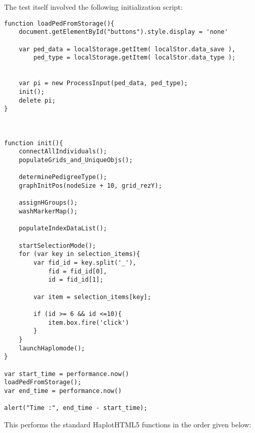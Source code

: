 The test itself involved the following initialization script:

\begingroup
\begin{spacing}{1}
\begin{lstlisting}[label=code:inithaplo]
function loadPedFromStorage(){
	document.getElementById("buttons").style.display = 'none'

	var ped_data = localStorage.getItem( localStor.data_save ),
		ped_type = localStorage.getItem( localStor.data_type );


	var pi = new ProcessInput(ped_data, ped_type);
	init();
	delete pi;
}



function init(){
	connectAllIndividuals();
	populateGrids_and_UniqueObjs();

	determinePedigreeType();
	graphInitPos(nodeSize + 10, grid_rezY);

	assignHGroups();
	washMarkerMap();

	populateIndexDataList();

	startSelectionMode();
	for (var key in selection_items){
		var fid_id = key.split('_'),
			fid = fid_id[0],
			id = fid_id[1];

		var item = selection_items[key];

		if (id >= 6 && id <=10){
			item.box.fire('click')
		}
	}
	launchHaplomode();
}

var start_time = performance.now()
loadPedFromStorage();
var end_time = performance.now()

alert("Time :", end_time - start_time);

\end{lstlisting}
\vspace{-10pt}
\end{spacing}
\endgroup


This performs the standard HaplotHTML5 functions in the order given below:

